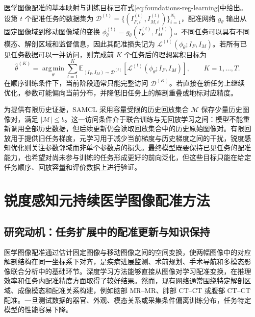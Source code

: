 医学图像配准的基本映射与训练目标已在式\eqref{eq:foundations-reg-learning}中给出。设第 $t$ 个配准任务的数据集为
$\mathcal{D}^{(t)}=\{(I_{F,i}^{(t)},I_{M,i}^{(t)})\}_{i=1}^{N_t}$，配准网络
$g_{\theta}$ 输出从固定图像域到移动图像域的变换
$\phi_{\theta}^{(t)}=g_{\theta}(I_F^{(t)},I_M^{(t)})$。不同任务可以具有不同模态、解剖区域和监督信息，因此其配准损失记为
$\mathcal{L}^{(t)}(\phi_{\theta};I_F,I_M)$。若所有已见任务数据可以一并访问，则完成前 $K$ 个任务后的理想累积目标为
\begin{equation}
\widehat{\theta}^{(K)}
=
\operatorname*{arg\,min}_{\theta}
\sum_{t=1}^{K}
\mathbb{E}_{(I_F,I_M)\sim\mathcal{D}^{(t)}}
\left[
\mathcal{L}^{(t)}(\phi_{\theta};I_F,I_M)
\right],
\qquad K=1,\ldots,T.
\label{eq:samcl-cumulative-objective}
\end{equation}
在顺序训练条件下，当前阶段通常只能完整访问 $\mathcal{D}^{(K)}$。若直接在新任务上继续优化，参数可能偏向当前分布，并降低旧任务上的解剖重叠或地标对应精度。

为提供有限历史证据，SAMCL 采用容量受限的历史回放集合 $\mathcal{M}$ 保存少量历史图像对，满足
$|\mathcal{M}|\leq b$。这一访问条件介于联合训练与无回放学习之间：模型不能重新调用全部历史数据，但后续更新仍会读取回放集合中的历史原始图像对。有限回放用于提供旧任务梯度，元学习用于减少当前梯度与历史梯度之间的干扰，锐度感知优化则关注参数邻域而非单个参数点的损失。最终模型既要保持已见任务的配准能力，也希望对尚未参与训练的任务形成更好的前向泛化，但这些目标只能在给定任务顺序、回放容量和评价数据上进行验证。

\section{锐度感知元持续医学图像配准方法}
\label{sec:samcl}

\subsection{研究动机：任务扩展中的配准更新与知识保持}
\label{subsec:samcl-motivation}

医学图像配准通过估计固定图像与移动图像之间的空间变换，使两幅图像中的对应解剖结构在同一坐标系下对齐，是疾病进展监测、术前规划、手术导航和多模态影像联合分析中的基础环节\cite{maintz1998registration,gupta2021registration,maes1997mutualinformation,sotiras2013deformable}。深度学习方法能够直接从图像对学习配准变换，在推理效率和任务内配准精度方面取得了较好结果\cite{haskins2020deepreg,balakrishnan2019voxelmorph}。然而，现有网络通常围绕特定解剖区域、成像模态和配准关系构建，例如脑部 MR--MR、肺部 CT--CT 或腹部 CT--CT 配准\cite{kang2022dual,che2023amnet,hering2021lungreg}。一旦测试数据的器官、外观、模态关系或采集条件偏离训练分布，任务特定模型的性能容易下降。

